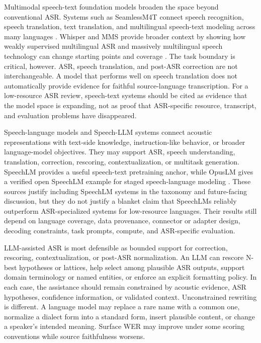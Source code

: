 \documentclass[pdflatex,sn-basic]{sn-jnl}
\theoremstyle{thmstyleone}
\theoremstyle{thmstyletwo}
\theoremstyle{thmstylethree}
\begin{document}
Multimodal speech-text foundation models broaden the space beyond conventional ASR. Systems such as SeamlessM4T connect speech recognition, speech translation, text translation, and multilingual speech-text modeling across many languages \citep{seamless2025_joint_speech_text_mt}. Whisper and MMS provide broader context by showing how weakly supervised multilingual ASR and massively multilingual speech technology can change starting points and coverage \citep{pmlr-v202-radford23a,pratap2024mms}. The task boundary is critical, however. ASR, speech translation, and post-ASR correction are not interchangeable. A model that performs well on speech translation does not automatically provide evidence for faithful source-language transcription. For a low-resource ASR review, speech-text systems should be cited as evidence that the model space is expanding, not as proof that ASR-specific resource, transcript, and evaluation problems have disappeared.

Speech-language models and Speech-LLM systems connect acoustic representations with text-side knowledge, instruction-like behavior, or broader language-model objectives. They may support ASR, speech understanding, translation, correction, rescoring, contextualization, or multitask generation. SpeechLM provides a useful speech-text pretraining anchor, while OpusLM gives a verified open SpeechLM example for staged speech-language modeling \citep{zhang2024_speechlm,tian25b_interspeech}. These sources justify including SpeechLM systems in the taxonomy and future-facing discussion, but they do not justify a blanket claim that SpeechLMs reliably outperform ASR-specialized systems for low-resource languages. Their results still depend on language coverage, data provenance, connector or adapter design, decoding constraints, task prompts, compute, and ASR-specific evaluation.

LLM-assisted ASR is most defensible as bounded support for correction, rescoring, contextualization, or post-ASR normalization. An LLM can rescore N-best hypotheses or lattices, help select among plausible ASR outputs, support domain terminology or named entities, or enforce an explicit formatting policy. In each case, the assistance should remain constrained by acoustic evidence, ASR hypotheses, confidence information, or validated context. Unconstrained rewriting is different. A language model may replace a rare name with a common one, normalize a dialect form into a standard form, insert plausible content, or change a speaker's intended meaning. Surface WER may improve under some scoring conventions while source faithfulness worsens.
\end{document}
